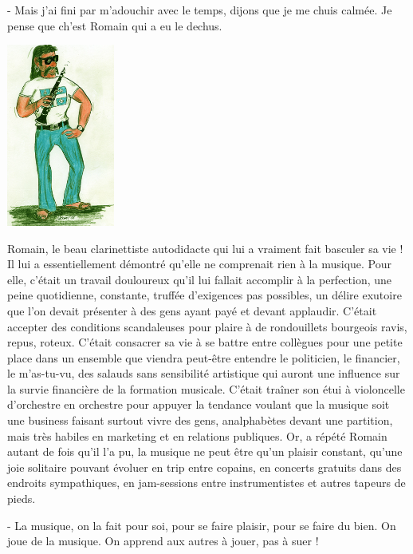 - Mais j’ai fini par m’adouchir avec le temps, dijons que je me chuis calmée. Je pense que ch’est Romain qui a eu le dechus. 

\begin{floatingfigure}[l]{40mm}
\includegraphics[height=60mm]{corps/chapitre16/img/personnage-romain-jeune.jpg}
\end{floatingfigure}

Romain, le beau clarinettiste autodidacte qui lui a vraiment fait basculer sa vie ! Il lui a essentiellement démontré qu’elle ne comprenait rien à la musique. Pour elle, c’était un travail douloureux qu’il lui fallait accomplir à la perfection, une peine quotidienne, constante, truffée d’exigences pas possibles, un délire exutoire que l’on devait présenter à des gens ayant payé et devant applaudir. C’était accepter des conditions scandaleuses pour plaire à de rondouillets bourgeois ravis, repus, roteux. C’était consacrer sa vie à se battre entre collègues pour une petite place dans un ensemble que viendra peut-être entendre le politicien, le financier, le m’as-tu-vu, des salauds sans sensibilité artistique qui auront une influence sur la survie financière de la formation musicale. C’était traîner son étui à violoncelle d’orchestre en orchestre pour appuyer la tendance voulant que la musique soit une business faisant surtout vivre des gens, analphabètes devant une partition, mais très habiles en marketing et en relations publiques. Or, a répété Romain autant de fois qu’il l’a pu, la musique ne peut être qu’un plaisir constant, qu’une joie solitaire pouvant évoluer en trip entre copains, en concerts gratuits dans des endroits sympathiques, en jam-sessions entre instrumentistes et autres tapeurs de pieds.

- La musique, on la fait pour soi, pour se faire plaisir, pour se faire du bien. On joue de la musique. On apprend aux autres à jouer, pas à suer !

